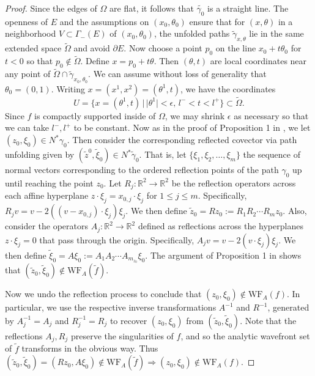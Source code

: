 \documentclass[10pt]{amsart}
\theoremstyle{definition}
\theoremstyle{definition}
\theoremstyle{definition}
\newcommand{ \rn }[1]{\mathbb{R}^{#1}}
\begin{document}
\begin{proof}
Since the edges of $\Omega$ are flat, it follows that $\widetilde{\gamma_{0}}$ is a straight line. The openness of $E$ and the assumptions on $(x_{0},\theta_{0})$ ensure that for $(x,\theta)$ in a neighborhood $V \subset \Gamma_{-}(E)$ of $(x_{0}, \theta_{0})$, the unfolded paths $\widetilde{\gamma}_{x,\theta}$ lie in the same extended space $\widetilde{\Omega}$ and avoid $\partial E$. Now choose a point $p_{0}$ on the line $x_{0} + t\theta_{0}$ for $t < 0$ so that $p_{0} \notin \widetilde{\Omega}$. Define $x = p_{0} + t\theta$. Then $(\theta, t)$ are local coordinates near any point of $\widetilde{\Omega} \cap \widetilde{\gamma}_{x_{0},\theta_{0}}$. We can assume without loss of generality that $\theta_{0} = (0,1)$. Writing $x = (x^{1},x^{2}) = (\theta^{1}, t)$, we have the coordinates
\begin{equation*}
U = \{x = (\theta^{1}, t) \, | \, |\theta^{1}| < \epsilon, \, l^{-} < t < l^{+} \} \subset \widetilde{\Omega}.
\end{equation*}
Since $f$ is compactly supported inside of $\Omega$, we may shrink $\epsilon$ as necessary so that we can take $l^{-}, l^{+}$ to be constant. Now as in the proof of Proposition 1 in \cite{xraygeneric}, we let $(z_{0}, \xi_{0} )\in N^{*}\gamma_{0}$. Then consider the corresponding reflected covector via path unfolding given by $(\widetilde{z}^{0}, \widetilde{\xi}_{0}) \in N^{*}\widetilde{\gamma}_{0}$. That is, let $\{\xi_{1},\xi_{2},\ldots, \xi_{m}\}$ the sequence of normal vectors corresponding to the ordered reflection points of the path $\gamma_{0}$ up until reaching the point $z_{0}$. Let $R_{j}:\rn{2} \to \rn{2}$ be the reflection operators across each affine hyperplane $z \cdot \xi_{j} = x_{0,j} \cdot \xi_{j}$ for $1 \leq j \leq m$. Specifically, $R_{j}v = v- 2((v-x_{0,j})\cdot \xi_{j})\xi_{j}$. We then define $\widetilde{z}_{0} = Rz_{0} := R_{1}R_{2} \cdots R_{m}z_{0}$. Also, consider the operators $A_{j}:\rn{2} \to \rn{2}$ defined as reflections across the hyperplanes $z \cdot \xi_{j} = 0$ that pass through the origin. Specifically, $A_{j}v = v - 2(v \cdot \xi_{j})\xi_{j}$. We then define $\widetilde{\xi}_{0} = A\xi_{0} := A_{1}A_{2} \cdots A_{m_{z_{0}}}\xi_{0}$. The argument of Proposition 1 in \cite{xraygeneric} shows that $(\widetilde{z}_{0}, \widetilde{\xi}_{0}) \notin \mathrm{WF}_{A}(\widetilde{f})$. 

Now we undo the reflection process to conclude that $(z_{0}, \xi_{0}) \notin \mathrm{WF}_{A}(f)$. In particular, we use the respective inverse transformations $A^{-1}$ and $R^{-1}$, generated by $A_{j}^{-1} = A_{j}$ and $R_{j}^{-1} = R_{j}$ to recover $(z_{0},\xi_{0})$ from $(\widetilde{z}_{0}, \widetilde{\xi}_{0})$. Note that the reflections $A_{j}, R_{j}$ preserve the singularities of $f$, and so the analytic wavefront set of $\widetilde{f}$ transforms in the obvious way. Thus $(\widetilde{z}_{0}, \widetilde{\xi}_{0}) = (Rz_{0}, A\xi_{0}) \notin \mathrm{WF}_{A}(\widetilde{f}) \Longrightarrow (z_{0}, \xi_{0}) \notin \mathrm{WF}_{A}(f)$.\end{proof}
\end{document}
